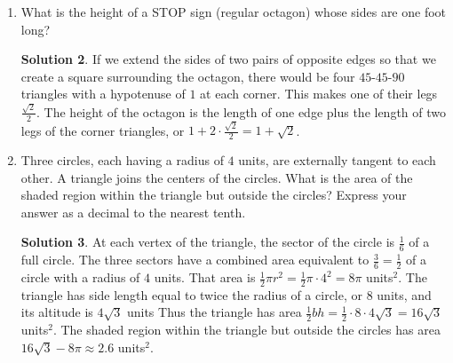 \documentclass{article}
\theoremstyle{definition}
\newtheorem*{solution}{Solution}
\begin{document}
\begin{multicols}{2}
\begin{enumerate}
\begin{solution}
                This means it's area is $\frac{\pi}{27}$, so the ratio between the area of the small circle and the area of the large circle is $\frac{1}{27}$.
            \end{solution}
        \item What is the height of a STOP sign (regular octagon) whose sides are one foot long?
            \begin{solution}
                If we extend the sides of two pairs of opposite edges so that we create a square surrounding the octagon, there would be four $45$-$45$-$90$ triangles with a hypotenuse of $1$ at each corner.
                This makes one of their legs $\frac{\sqrt{2}}{2}$.
                The height of the octagon is the length of one edge plus the length of two legs of the corner triangles, or $1 + 2 \cdot \frac{\sqrt{2}}{2} = 1 + \sqrt{2}$.
            \end{solution}
        \item Three circles, each having a radius of $4$ units, are externally tangent to each other.
            A triangle joins the centers of the circles.
            What is the area of the shaded region within the triangle but outside the circles?
            Express your answer as a decimal to the nearest tenth.
            \begin{center}
            \end{center}
            \begin{solution}
                At each vertex of the triangle, the sector of the circle is $\frac{1}{6}$ of a full circle.
                The three sectors have a combined area equivalent to $\frac{3}{6} = \frac{1}{2}$ of a circle with a radius of $4$ units.
                That area is $\frac{1}{2} \pi r^2 = \frac{1}{2} \pi \cdot 4^2 = 8\pi$ units$^2$.
                The triangle has side length equal to twice the radius of a circle, or $8$ units, and its altitude is $4\sqrt{3}$ units
                Thus the triangle has area $\frac{1}{2} bh = \frac{1}{2} \cdot 8 \cdot 4\sqrt{3} = 16\sqrt{3}$ units$^2$.
                The shaded region within the triangle but outside the circles has area $16\sqrt{3} - 8\pi \approx 2.6$ units$^2$.
            \end{solution}
    \end{enumerate}
\end{multicols}
\end{document}
